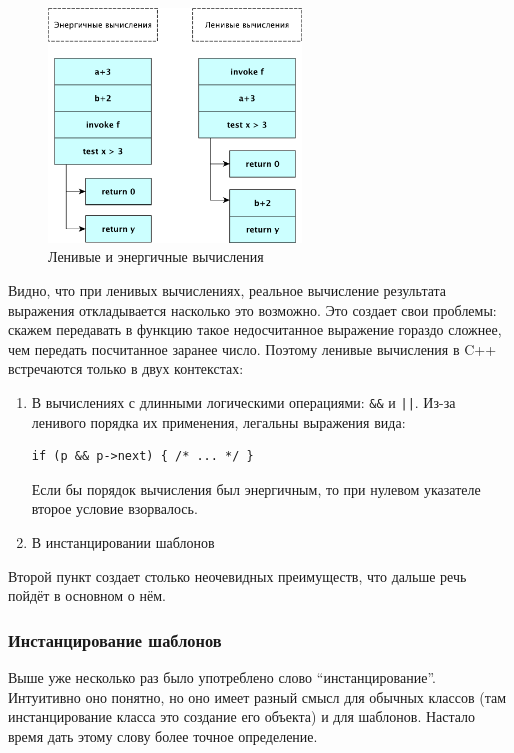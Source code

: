 \documentclass[a4paper,12pt,oneside]{article}
\begin{document}
\begin{figure}[h!]
\centering
\includegraphics[width=0.6\textwidth]{illustrations/lazyorder-crop.pdf}
\caption{Ленивые и энергичные вычисления}
\label{fig:lazy_calc}
\end{figure}

Видно, что при ленивых вычислениях, реальное вычисление результата выражения откладывается насколько это возможно. Это создает свои проблемы: скажем передавать в функцию такое недосчитанное выражение гораздо сложнее, чем передать посчитанное заранее число. Поэтому ленивые вычисления в C++ встречаются только в двух контекстах:

\begin{enumerate}
\item В вычислениях с длинными логическими операциями: \lstinline!&&! и \lstinline!||!. Из-за ленивого порядка их применения, легальны выражения вида:
\begin{lstlisting}
if (p && p->next) { /* ... */ }
\end{lstlisting}
Если бы порядок вычисления был энергичным, то при нулевом указателе второе условие взорвалось.
\item В инстанцировании шаблонов
\end{enumerate}

Второй пункт создает столько неочевидных преимуществ, что дальше речь пойдёт в основном о нём.

\subsubsection{Инстанцирование шаблонов}\label{Templateinstancing}

Выше уже несколько раз было употреблено слово ``инстанцирование''. Интуитивно оно понятно, но оно имеет разный смысл для обычных классов (там инстанцирование класса это создание его объекта) и для шаблонов. Настало время дать этому слову более точное определение.
\end{document}
